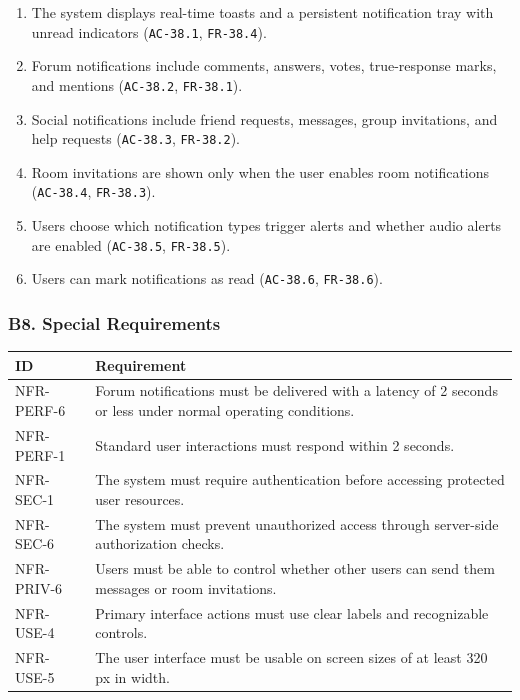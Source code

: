 \documentclass[12pt]{article}
\renewcommand{\baselinestretch}{1.5}
\begin{document}
\begin{enumerate}
\item The system displays real-time toasts and a persistent notification tray with unread indicators (\texttt{AC-38.1}, \texttt{FR-38.4}).
\item Forum notifications include comments, answers, votes, true-response marks, and mentions (\texttt{AC-38.2}, \texttt{FR-38.1}).
\item Social notifications include friend requests, messages, group invitations, and help requests (\texttt{AC-38.3}, \texttt{FR-38.2}).
\item Room invitations are shown only when the user enables room notifications (\texttt{AC-38.4}, \texttt{FR-38.3}).
\item Users choose which notification types trigger alerts and whether audio alerts are enabled (\texttt{AC-38.5}, \texttt{FR-38.5}).
\item Users can mark notifications as read (\texttt{AC-38.6}, \texttt{FR-38.6}).
\end{enumerate}
\par\medskip

\hypertarget{sec:b8-special-requirements}{}
\subsubsection*{B8. Special Requirements}
\par\medskip

\begingroup
\small
\renewcommand{\baselinestretch}{1.0}\selectfont
\renewcommand{\arraystretch}{1.15}
\setlength{\tabcolsep}{6pt}
\begin{longtable}{|>{\raggedright\arraybackslash}p{}|>{\raggedright\arraybackslash}p{}|}
\hline
\textbf{ID} & \textbf{Requirement} \\ \hline
\endhead
NFR-PERF-6 & Forum notifications must be delivered with a latency of 2 seconds or less under normal operating conditions. \\ \hline
NFR-PERF-1 & Standard user interactions must respond within 2 seconds. \\ \hline
NFR-SEC-1 & The system must require authentication before accessing protected user resources. \\ \hline
NFR-SEC-6 & The system must prevent unauthorized access through server-side authorization checks. \\ \hline
NFR-PRIV-6 & Users must be able to control whether other users can send them messages or room invitations. \\ \hline
NFR-USE-4 & Primary interface actions must use clear labels and recognizable controls. \\ \hline
NFR-USE-5 & The user interface must be usable on screen sizes of at least 320 px in width. \\ \hline
\end{longtable}
\endgroup
\par\medskip
\end{document}

